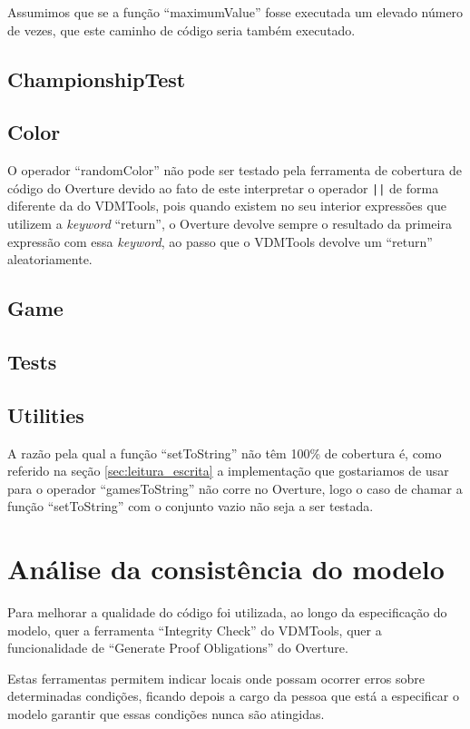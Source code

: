 \documentclass{article}
\begin{document}
Assumimos que se a função ``maximumValue'' fosse executada um elevado
número de vezes, que este caminho de código seria também executado.

\subsection{ChampionshipTest}


\subsection{Color}


O operador ``randomColor'' não pode ser testado pela ferramenta de
cobertura de código do Overture devido ao fato de este interpretar o
operador \verb=||= de forma diferente da do VDMTools, pois quando
existem no seu interior expressões que utilizem a \emph{keyword}
``return'', o Overture devolve sempre o resultado da primeira
expressão com essa \emph{keyword}, ao passo que o VDMTools devolve um
``return'' aleatoriamente.

\subsection{Game}

\subsection{Tests}

\subsection{Utilities}

A razão pela qual a função ``setToString'' não têm 100\% de cobertura
é, como referido na seção \ref{sec:leitura_escrita} a implementação
que gostariamos de usar para o operador ``gamesToString'' não corre no
Overture, logo o caso de chamar a função ``setToString'' com o
conjunto vazio não seja a ser testada.


\section{Análise da consistência do modelo}
Para melhorar a qualidade do código foi utilizada, ao longo da
especificação do modelo, quer a ferramenta ``Integrity Check'' do
VDMTools, quer a funcionalidade de ``Generate Proof Obligations'' do Overture.

Estas ferramentas permitem indicar locais onde possam ocorrer erros
sobre determinadas condições, ficando depois a cargo da pessoa que
está a especificar o modelo garantir que essas condições nunca são
atingidas.
\end{document}
